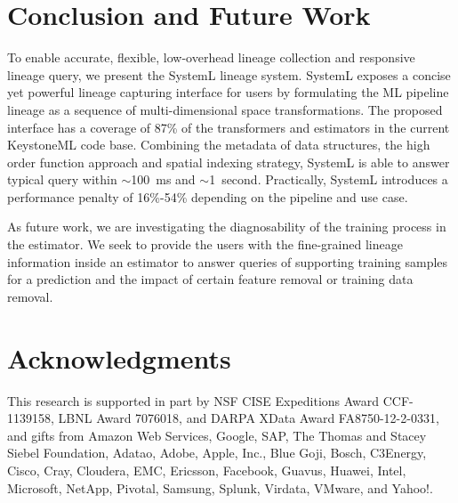 \documentclass{sig-alternate}
\begin{document}
\section{Conclusion and Future Work}
\label{sec:Conclusion}
To enable accurate, flexible, low-overhead lineage collection and responsive lineage query, we present the SystemL lineage system.
SystemL exposes a concise yet powerful lineage capturing interface for users by formulating the ML pipeline lineage as a sequence
of multi-dimensional space transformations. The proposed interface has a coverage of 87\% of the transformers and estimators
in the current KeystoneML code base. Combining the metadata of data structures, the high order function approach and spatial indexing
strategy, SystemL is able to answer typical query within $\sim$100~ms and $\sim$1~second. Practically, SystemL introduces a
performance penalty of 16\%-54\% depending on the pipeline and use case.

As future work, we are investigating the diagnosability of the training process in the estimator. We seek to provide the users with
the fine-grained lineage information inside an estimator to answer queries of supporting training samples for
a prediction and the impact of certain feature removal or training data removal.

\section{Acknowledgments}
This research is supported in part by NSF CISE Expeditions Award CCF-1139158, LBNL Award 7076018, and DARPA XData Award FA8750-12-2-0331, and gifts from Amazon Web Services, Google, SAP,  The Thomas and Stacey Siebel Foundation, Adatao, Adobe, Apple, Inc., Blue Goji, Bosch, C3Energy, Cisco, Cray, Cloudera, EMC, Ericsson, Facebook, Guavus, Huawei, Intel, Microsoft, NetApp, Pivotal, Samsung, Splunk, Virdata, VMware, and Yahoo!. 

%

%
%



\balancecolumns

\end{document}
